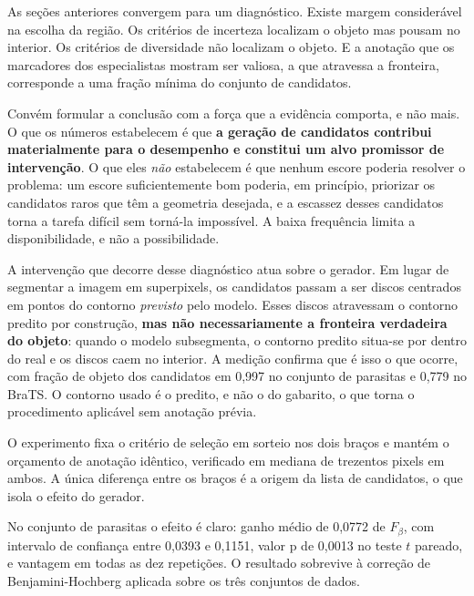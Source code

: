 As seções anteriores convergem para um diagnóstico. Existe margem considerável na escolha da região. Os critérios de incerteza localizam o objeto mas pousam no interior. Os critérios de diversidade não localizam o objeto. E a anotação que os marcadores dos especialistas mostram ser valiosa, a que atravessa a fronteira, corresponde a uma fração mínima do conjunto de candidatos.

Convém formular a conclusão com a força que a evidência comporta, e não mais. O que os números estabelecem é que \textbf{a geração de candidatos contribui materialmente para o desempenho e constitui um alvo promissor de intervenção}. O que eles \emph{não} estabelecem é que nenhum escore poderia resolver o problema: um escore suficientemente bom poderia, em princípio, priorizar os candidatos raros que têm a geometria desejada, e a escassez desses candidatos torna a tarefa difícil sem torná-la impossível. A baixa frequência limita a disponibilidade, e não a possibilidade.

A intervenção que decorre desse diagnóstico atua sobre o gerador. Em lugar de segmentar a imagem em superpixels, os candidatos passam a ser discos centrados em pontos do contorno \emph{previsto} pelo modelo. Esses discos atravessam o contorno predito por construção, \textbf{mas não necessariamente a fronteira verdadeira do objeto}: quando o modelo subsegmenta, o contorno predito situa-se por dentro do real e os discos caem no interior. A medição confirma que é isso o que ocorre, com fração de objeto dos candidatos em 0,997 no conjunto de parasitas e 0,779 no BraTS. O contorno usado é o predito, e não o do gabarito, o que torna o procedimento aplicável sem anotação prévia.

O experimento fixa o critério de seleção em sorteio nos dois braços e mantém o orçamento de anotação idêntico, verificado em mediana de trezentos pixels em ambos. A única diferença entre os braços é a origem da lista de candidatos, o que isola o efeito do gerador.

\begin{table}[htb]
\centering
\caption{Troca do gerador de candidatos, com critério e orçamento fixos.}
\label{tab_gerador}

\end{table}



No conjunto de parasitas o efeito é claro: ganho médio de 0,0772 de $F_\beta$, com intervalo de confiança entre 0,0393 e 0,1151, valor p de 0,0013 no teste $t$ pareado, e vantagem em todas as dez repetições. O resultado sobrevive à correção de Benjamini-Hochberg aplicada sobre os três conjuntos de dados.

